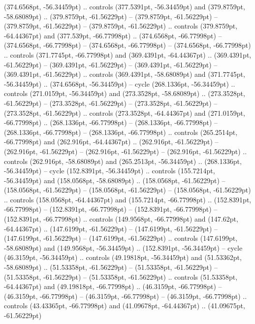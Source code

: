 (374.6568pt, -56.34459pt) .. controls (377.5391pt, -56.34459pt) and (379.8759pt, -58.68089pt) .. (379.8759pt, -61.56229pt)
 -- (379.8759pt, -61.56229pt)
 -- (379.8759pt, -61.56229pt)
 -- (379.8759pt, -61.56229pt) .. controls (379.8759pt, -64.44367pt) and (377.539pt, -66.77998pt) .. (374.6568pt, -66.77998pt)
 -- (374.6568pt, -66.77998pt)
 -- (374.6568pt, -66.77998pt)
 -- (374.6568pt, -66.77998pt) .. controls (371.7745pt, -66.77998pt) and (369.4391pt, -64.44367pt) .. (369.4391pt, -61.56229pt)
 -- (369.4391pt, -61.56229pt)
 -- (369.4391pt, -61.56229pt)
 -- (369.4391pt, -61.56229pt) .. controls (369.4391pt, -58.68089pt) and (371.7745pt, -56.34459pt) .. (374.6568pt, -56.34459pt) -- cycle
(268.1336pt, -56.34459pt) .. controls (271.0159pt, -56.34459pt) and (273.3528pt, -58.68089pt) .. (273.3528pt, -61.56229pt)
 -- (273.3528pt, -61.56229pt)
 -- (273.3528pt, -61.56229pt)
 -- (273.3528pt, -61.56229pt) .. controls (273.3528pt, -64.44367pt) and (271.0159pt, -66.77998pt) .. (268.1336pt, -66.77998pt)
 -- (268.1336pt, -66.77998pt)
 -- (268.1336pt, -66.77998pt)
 -- (268.1336pt, -66.77998pt) .. controls (265.2514pt, -66.77998pt) and (262.916pt, -64.44367pt) .. (262.916pt, -61.56229pt)
 -- (262.916pt, -61.56229pt)
 -- (262.916pt, -61.56229pt)
 -- (262.916pt, -61.56229pt) .. controls (262.916pt, -58.68089pt) and (265.2513pt, -56.34459pt) .. (268.1336pt, -56.34459pt) -- cycle
(152.8391pt, -56.34459pt) .. controls (155.7214pt, -56.34459pt) and (158.0568pt, -58.68089pt) .. (158.0568pt, -61.56229pt)
 -- (158.0568pt, -61.56229pt)
 -- (158.0568pt, -61.56229pt)
 -- (158.0568pt, -61.56229pt) .. controls (158.0568pt, -64.44367pt) and (155.7214pt, -66.77998pt) .. (152.8391pt, -66.77998pt)
 -- (152.8391pt, -66.77998pt)
 -- (152.8391pt, -66.77998pt)
 -- (152.8391pt, -66.77998pt) .. controls (149.9568pt, -66.77998pt) and (147.62pt, -64.44367pt) .. (147.6199pt, -61.56229pt)
 -- (147.6199pt, -61.56229pt)
 -- (147.6199pt, -61.56229pt)
 -- (147.6199pt, -61.56229pt) .. controls (147.6199pt, -58.68089pt) and (149.9568pt, -56.34459pt) .. (152.8391pt, -56.34459pt) -- cycle
(46.3159pt, -56.34459pt) .. controls (49.19818pt, -56.34459pt) and (51.53362pt, -58.68089pt) .. (51.53358pt, -61.56229pt)
 -- (51.53358pt, -61.56229pt)
 -- (51.53358pt, -61.56229pt)
 -- (51.53358pt, -61.56229pt) .. controls (51.53358pt, -64.44367pt) and (49.19818pt, -66.77998pt) .. (46.3159pt, -66.77998pt)
 -- (46.3159pt, -66.77998pt)
 -- (46.3159pt, -66.77998pt)
 -- (46.3159pt, -66.77998pt) .. controls (43.43365pt, -66.77998pt) and (41.09678pt, -64.44367pt) .. (41.09675pt, -61.56229pt)
